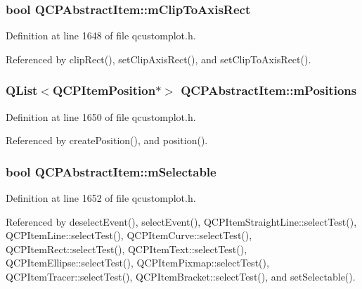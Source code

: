 \subsubsection[{m\+Clip\+To\+Axis\+Rect}]{\setlength{\rightskip}{0pt plus 5cm}bool Q\+C\+P\+Abstract\+Item\+::m\+Clip\+To\+Axis\+Rect\hspace{0.3cm}{\ttfamily [protected]}}\label{class_q_c_p_abstract_item_ad2a70ff6b658fcb84a9427f69d3f587d}


Definition at line 1648 of file qcustomplot.\+h.



Referenced by clip\+Rect(), set\+Clip\+Axis\+Rect(), and set\+Clip\+To\+Axis\+Rect().

\hypertarget{class_q_c_p_abstract_item_af94ff71b6a15ea6d028ab8bd8eccd012}{}
\subsubsection[{m\+Positions}]{\setlength{\rightskip}{0pt plus 5cm}Q\+List$<${\bf Q\+C\+P\+Item\+Position}$\ast$$>$ Q\+C\+P\+Abstract\+Item\+::m\+Positions\hspace{0.3cm}{\ttfamily [protected]}}\label{class_q_c_p_abstract_item_af94ff71b6a15ea6d028ab8bd8eccd012}


Definition at line 1650 of file qcustomplot.\+h.



Referenced by create\+Position(), and position().

\hypertarget{class_q_c_p_abstract_item_ad81eb35c8726a0f458db9df9732e0e41}{}
\subsubsection[{m\+Selectable}]{\setlength{\rightskip}{0pt plus 5cm}bool Q\+C\+P\+Abstract\+Item\+::m\+Selectable\hspace{0.3cm}{\ttfamily [protected]}}\label{class_q_c_p_abstract_item_ad81eb35c8726a0f458db9df9732e0e41}


Definition at line 1652 of file qcustomplot.\+h.



Referenced by deselect\+Event(), select\+Event(), Q\+C\+P\+Item\+Straight\+Line\+::select\+Test(), Q\+C\+P\+Item\+Line\+::select\+Test(), Q\+C\+P\+Item\+Curve\+::select\+Test(), Q\+C\+P\+Item\+Rect\+::select\+Test(), Q\+C\+P\+Item\+Text\+::select\+Test(), Q\+C\+P\+Item\+Ellipse\+::select\+Test(), Q\+C\+P\+Item\+Pixmap\+::select\+Test(), Q\+C\+P\+Item\+Tracer\+::select\+Test(), Q\+C\+P\+Item\+Bracket\+::select\+Test(), and set\+Selectable().

